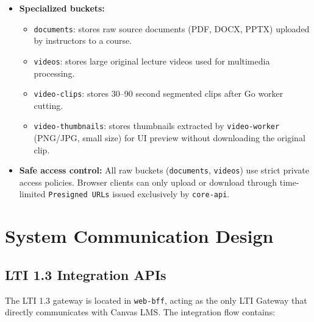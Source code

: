 \begin{itemize}
    \item \textbf{Specialized buckets:}
    \begin{itemize}
        \item \texttt{documents}: stores raw source documents (PDF, DOCX,
              PPTX) uploaded by instructors to a course.
        \item \texttt{videos}: stores large original lecture videos used
              for multimedia processing.
        \item \texttt{video-clips}: stores 30--90 second segmented clips
              after Go worker cutting.
        \item \texttt{video-thumbnails}: stores thumbnails extracted by
              \texttt{video-worker} (PNG/JPG, small size) for UI preview
              without downloading the original clip.
    \end{itemize}
    \item \textbf{Safe access control:} All raw buckets
          (\texttt{documents}, \texttt{videos}) use strict private access
          policies. Browser clients can only upload or download through
          time-limited \texttt{Presigned URLs} issued exclusively by
          \texttt{core-api}.
\end{itemize}

\section{System Communication Design}

\subsection{LTI 1.3 Integration APIs}

The LTI 1.3 gateway is located in \texttt{web-bff}, acting as the only LTI
Gateway that directly communicates with Canvas LMS. The integration flow
contains:

